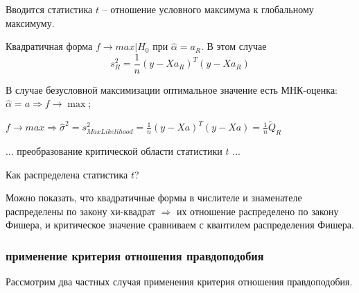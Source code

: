 \documentclass[main.tex]{subfiles}
\begin{document}
Вводится статистика $ t $ -- отношение условного максимума к глобальному максимуму.

Квадратичная форма $ f \to max | H_0 $ при $ \hat \alpha = a_R $.
В этом случае
$$ s_R^2 = \frac{1}{n} \left(y - X a_R\right)^T (y - Xa_R) $$

В случае безусловной максимизации оптимальное значение есть МНК-оценка:
$ \hat \alpha = a \Rightarrow f \to \max $;

$ f \to max \Rightarrow \hat \sigma^2 = s_{MaxLikelihood}^2 = \frac{1}{n} \left( y - Xa \right)^T \left( y - Xa \right) = \frac{1}{n} \tilde Q_R $

... преобразование критической области статистики $t$ ...

Как распределена статистика $ t $?

Можно показать, что квадратичные формы в числителе и знаменателе распределены по закону хи-квадрат $ \Rightarrow $ их отношение распределено по закону Фишера, и критическое значение сравниваем с квантилем распределения Фишера.

\subsubsection{применение критерия отношения правдоподобия}

Рассмотрим два частных случая применения критерия отношения правдоподобия.
\end{document}
